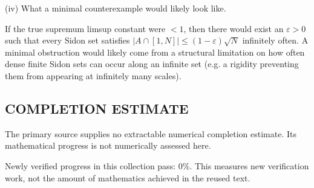 (iv) What a minimal counterexample would likely look like.

If the true supremum limsup constant were $<1$, then there would exist an $\varepsilon>0$ such that every Sidon set satisfies $|A\cap[1,N]|\le (1-\varepsilon)\sqrt{N}$ infinitely often.
A minimal obstruction would likely come from a structural limitation on how often dense finite Sidon sets can occur along an infinite set (e.g. a rigidity preventing them from appearing at infinitely many scales).




\subsection*{COMPLETION ESTIMATE}
The primary source supplies no extractable numerical completion estimate. Its mathematical progress is not numerically assessed here.

Newly verified progress in this collection pass: $0\%$. This measures new verification work, not the amount of mathematics achieved in the reused text.

